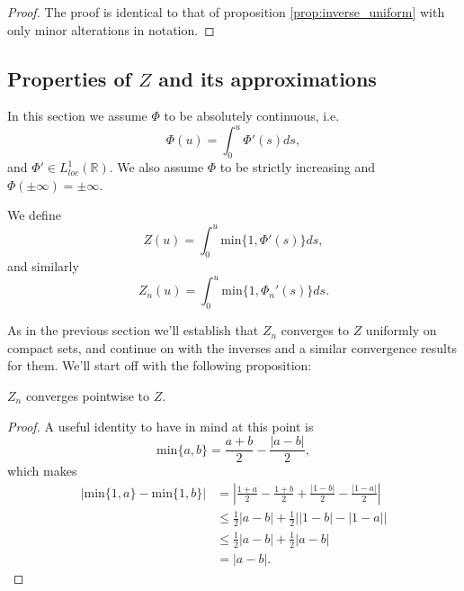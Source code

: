 \documentclass[11pt, a4paper]{article}
\begin{document}
\begin{appendix}
\begin{proof}
The proof is identical to that of proposition \ref{prop:inverse_uniform} with only minor alterations in notation.
\end{proof}

\subsection{Properties of $Z$ and its approximations}
In this section we assume $\Phi$ to be absolutely continuous, i.e.
\begin{equation*}
\Phi(u) = \int_0^u \Phi'(s)ds,
\end{equation*}
and $\Phi' \in L^1_{loc}(\mathbb{R})$. We also assume $\Phi$ to be strictly increasing and  $\Phi(\pm \infty) = \pm \infty$.

We define 
\begin{equation}
Z(u) = \int_0^u \mathrm{min}\{1, \Phi'(s)\} ds,
\end{equation}
and similarly
\begin{equation}
Z_n(u) = \int_0^u\mathrm{min}\{1, \Phi_n'(s)\}ds.
\end{equation}

As in the previous section we'll establish that $Z_n$ converges to $Z$ uniformly on compact sets, and continue on with the inverses and a similar convergence results for them. We'll start off with the following proposition:

\begin{proposition}
$Z_n$ converges pointwise to $Z$.
\end{proposition}
\begin{proof}
A useful identity to have in mind at this point is
\begin{equation*}
\mathrm{min}\{a,b\} = \frac{a+b}{2} - \frac{|a-b|}{2},
\end{equation*}
which makes
\begin{align*}
|\mathrm{min}\{1,a\} - \mathrm{min}\{1,b\}| &= \left| \frac{1+a}{2} -\frac{1+b}{2} + \frac{|1-b|}{2} - \frac{|1-a|}{2}\right| \\
&\leq \frac{1}{2}|a-b| + \frac{1}{2}\big| |1-b| - |1-a| \big| \\
&\leq \frac{1}{2}|a-b| + \frac{1}{2}|a-b| \\
&= |a-b|.
\end{align*}


\end{proof}
\end{appendix}
\end{document}
